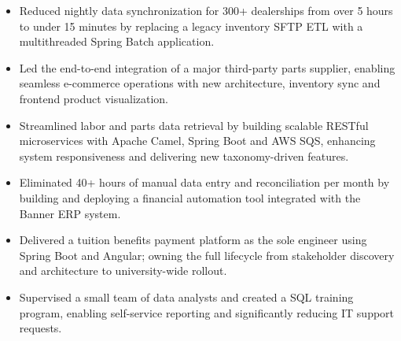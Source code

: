 \begin{itemize}[leftmargin=*]
    \item Reduced nightly data synchronization for 300+ dealerships from over 5 hours to under 15 minutes by replacing a
    legacy inventory SFTP ETL with a multithreaded Spring Batch application.
    \item
    Led the end-to-end integration of a major third-party parts supplier, enabling seamless e-commerce operations with
    new architecture, inventory sync and frontend product visualization.
    \item
    Streamlined labor and parts data retrieval by building scalable RESTful microservices with Apache Camel, Spring
    Boot and AWS SQS, enhancing system responsiveness and delivering new taxonomy-driven features.
\end{itemize}
\vspace{\jobGroupBottomMargin}

\begin{itemize}[leftmargin=*]
    \item Eliminated 40+ hours of manual data entry and reconciliation per month by building and deploying a financial
    automation tool integrated with the Banner ERP system.
    \item
    Delivered a tuition benefits payment platform as the sole engineer using Spring Boot and Angular; owning the full
    lifecycle from stakeholder discovery and architecture to university-wide rollout.
    \item
    Supervised a small team of data analysts and created a SQL training program, enabling self-service reporting and
    significantly reducing IT support requests.
\end{itemize}
\vspace{\jobGroupBottomMargin}

